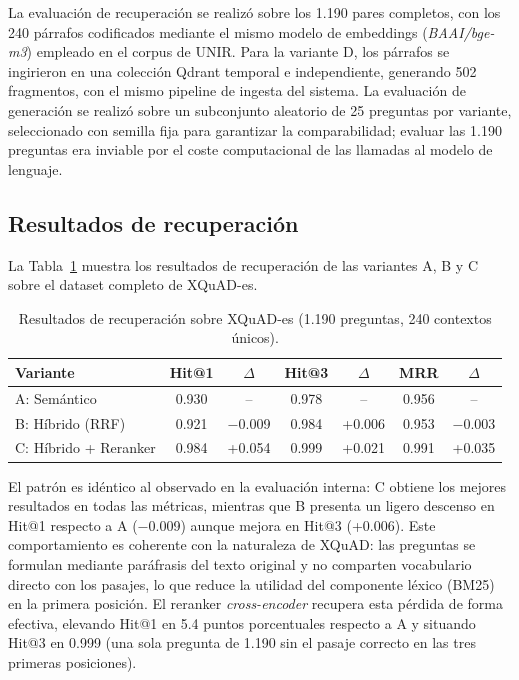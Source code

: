 La evaluación de recuperación se realizó sobre los 1.190 pares completos, con los 240 párrafos codificados mediante el mismo modelo de embeddings (\textit{BAAI/bge-m3}) empleado en el corpus de UNIR.
Para la variante D, los párrafos se ingirieron en una colección Qdrant temporal e independiente, generando 502 fragmentos, con el mismo pipeline de ingesta del sistema.
La evaluación de generación se realizó sobre un subconjunto aleatorio de 25 preguntas por variante, seleccionado con semilla fija para garantizar la comparabilidad; evaluar las 1.190 preguntas era inviable por el coste computacional de las llamadas al modelo de lenguaje.

\subsection{Resultados de recuperación}\label{subsec:xquad-resultados-recuperacion}

La Tabla~\ref{tab:xquad-retrieval} muestra los resultados de recuperación de las variantes A, B y C sobre el dataset completo de XQuAD-es.

\begin{table}[H]
\centering
\begin{tabular}{lcccccc}
\toprule
\textbf{Variante} & \textbf{Hit@1} & \textbf{$\Delta$} & \textbf{Hit@3} & \textbf{$\Delta$} & \textbf{MRR} & \textbf{$\Delta$} \\
\midrule
A: Semántico           & 0.930 & --       & 0.978 & --       & 0.956 & -- \\
B: Híbrido (RRF)       & 0.921 & $-$0.009 & 0.984 & +0.006   & 0.953 & $-$0.003 \\
C: Híbrido + Reranker  & 0.984 & +0.054   & 0.999 & +0.021   & 0.991 & +0.035 \\
\bottomrule
\end{tabular}
\caption{Resultados de recuperación sobre XQuAD-es (1.190 preguntas, 240 contextos únicos).}
\label{tab:xquad-retrieval}
\end{table}

El patrón es idéntico al observado en la evaluación interna: C obtiene los mejores resultados en todas las métricas, mientras que B presenta un ligero descenso en Hit@1 respecto a A ($-$0.009) aunque mejora en Hit@3 (+0.006). 
Este comportamiento es coherente con la naturaleza de XQuAD: las preguntas se formulan mediante paráfrasis del texto original y no comparten vocabulario directo con los pasajes, lo que reduce la utilidad del componente léxico (BM25) en la primera posición. 
El reranker \textit{cross-encoder} recupera esta pérdida de forma efectiva, elevando Hit@1 en 5.4 puntos porcentuales respecto a A y situando Hit@3 en 0.999 (una sola pregunta de 1.190 sin el pasaje correcto en las tres primeras posiciones).

